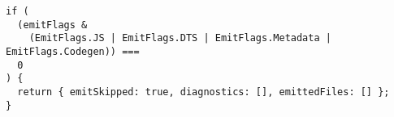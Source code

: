 \begin{verbatim}
if (
  (emitFlags &
    (EmitFlags.JS | EmitFlags.DTS | EmitFlags.Metadata | EmitFlags.Codegen)) ===
  0
) {
  return { emitSkipped: true, diagnostics: [], emittedFiles: [] };
}
\end{verbatim}

